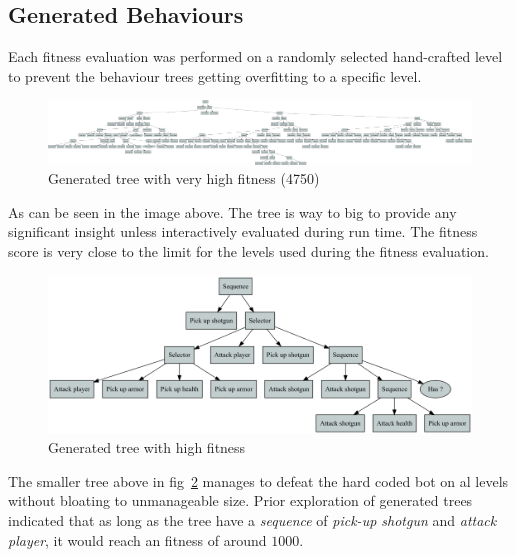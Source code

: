 \documentclass[a4paper, twocolumn]{article}
\begin{document}
        \clearpage

        \subsection{Generated Behaviours} \label{sec:generated_behaviours}

        Each fitness evaluation was performed on a randomly selected hand-crafted level to prevent the behaviour trees getting overfitting to a specific level. 

        \begin{figure}[H]
            \centering
            \includegraphics[width=\linewidth]{share/tree-fitness-4750.png}
            \caption{Generated tree with very high fitness (4750)}
            \label{fig:tree_fitness_4075}
        \end{figure}
        As can be seen in the image above. The tree is way to big to provide any significant insight unless interactively evaluated during run time. The fitness score is very close to the limit for the levels used during the fitness evaluation.


        \begin{figure}[H]
            \centering
            \includegraphics[width=\linewidth]{share/tree-fitness-3780.png}
            \caption{Generated tree with high fitness}
            \label{fig:tree_fitness_3650}
        \end{figure}
        The smaller tree above in fig~\cref{fig:tree_fitness_3650} manages to defeat the hard coded bot on al levels without bloating to unmanageable size. Prior exploration of generated trees indicated that as long as the tree have a \textit{sequence} of \textit{pick-up shotgun} and \textit{attack player}, it would reach an fitness of around \(1000\).
\end{document}

